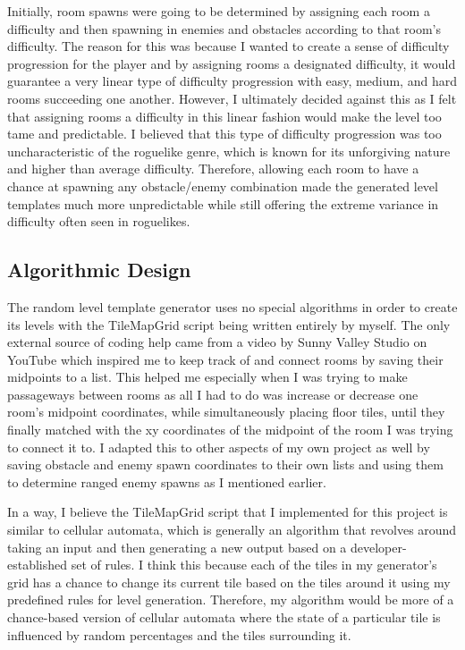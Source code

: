 \documentclass[10pt,twocolumn]{article}
\begin{document}
Initially, room spawns were going to be determined by assigning each room a difficulty and then spawning in enemies and obstacles according to that room's difficulty. The reason for this was because I wanted to create a sense of difficulty progression for the player and by assigning rooms a designated difficulty, it would guarantee a very linear type of difficulty progression with easy, medium, and hard rooms succeeding one another. However, I ultimately decided against this as I felt that assigning rooms a difficulty in this linear fashion would make the level too tame and predictable. I believed that this type of difficulty progression was too uncharacteristic of the roguelike genre, which is known for its unforgiving nature and higher than average difficulty. Therefore, allowing each room to have a chance at spawning any obstacle/enemy combination made the generated level templates much more unpredictable while still offering the extreme variance in difficulty often seen in roguelikes. 

\subsection{Algorithmic Design}

The random level template generator uses no special algorithms in order to create its levels with the TileMapGrid script being written entirely by myself. The only external source of coding help came from a video by Sunny Valley Studio on YouTube which inspired me to keep track of and connect rooms by saving their midpoints to a list\cite{sunny2021roomfirst}. This helped me especially when I was trying to make passageways between rooms as all I had to do was increase or decrease one room's midpoint coordinates, while simultaneously placing floor tiles, until they finally matched with the xy coordinates of the midpoint of the room I was trying to connect it to. I adapted this to other aspects of my own project as well by saving obstacle and enemy spawn coordinates to their own lists and using them to determine ranged enemy spawns as I mentioned earlier. 

In a way, I believe the TileMapGrid script that I implemented for this project is similar to cellular automata, which is generally an algorithm that revolves around taking an input and then generating a new output based on a developer-established set of rules\cite{minini2020combining}. I think this because each of the tiles in my generator's grid has a chance to change its current tile based on the tiles around it using my predefined rules for level generation. Therefore, my algorithm would be more of a chance-based version of cellular automata where the state of a particular tile is influenced by random percentages and the tiles surrounding it. 
\end{document}
